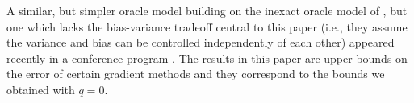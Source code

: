 A similar, but simpler oracle model building on the inexact oracle model of  \cite{DeGliNe14}, 
but one which lacks the bias-variance tradeoff central to this paper (i.e., they assume the variance and bias can be controlled independently of each other) appeared recently in a conference program \citep{DvoGa15}. The results in this paper are upper bounds on the error of certain gradient methods and they correspond to the bounds we obtained with $q=0$.



